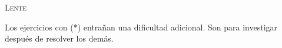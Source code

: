 \documentclass[11pt, spanish, a4paper, twoside]{article}
\begin{document}
\begin{center}
	\textsc{\LARGE Lente}
\end{center}

Los ejercicios con (*) entrañan una dificultad adicional. Son para investigar después de resolver los demás.


\begin{enumerate}












\end{enumerate}
\end{document}
